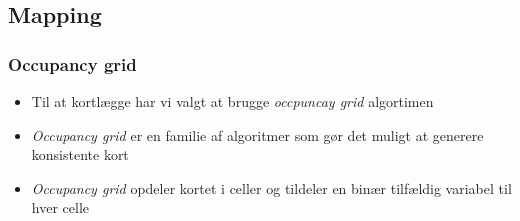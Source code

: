 \subsection{Mapping}
\begin{frame}
\frametitle{Occupancy grid}
\begin{itemize}
\item Til at kortlægge har vi valgt at brugge \textit{occpuncay grid} algortimen
\item \textit{Occupancy grid} er en familie af algoritmer som gør det muligt at generere konsistente kort
\item \textit{Occupancy grid} opdeler kortet i celler og tildeler en binær tilfældig variabel til hver celle
\end{itemize}
\end{frame}